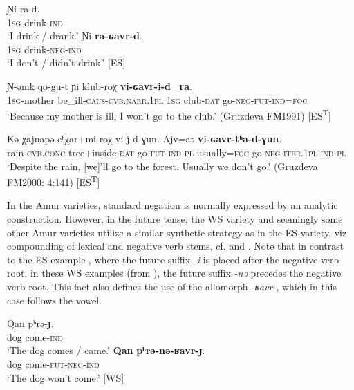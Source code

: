\documentclass[output=paper,colorlinks,citecolor=brown]{langscibook}
\begin{document}
\ea\label{ex:niv:1}
    \ea\label{ex:niv:1a}
        \gll Ɲi ra-d.  \\ 
             1\textsc{sg} drink-\textsc{ind}  \\
        \glt ‘I drink / drank.’
    \ex\label{ex:niv:1b}
        \gll Ɲi \textbf{ra-ɢavr-d}. \\
             1\textsc{sg} drink-\textsc{neg-ind}\\
        \glt  ‘I don’t / didn’t drink.’ [ES]
    \z
\z 

\ea\label{ex:niv:2}
    \gll Ɲ{}-əmk qo-gu-t ɲi klub-roχ \textbf{vi-ɢavr-i-d=ra}. \\ 
         \textsc{1sg}{}-mother be\_ill-\textsc{caus-cvb.narr.1pl} 1\textsc{sg} club-\textsc{dat} go-\textsc{neg-fut-ind=foc} \\
    \glt ‘Because my mother is ill, I won’t go to the club.’ (Gruzdeva FМ1991) [ES\textsuperscript{T}]
\z

\ea\label{ex:niv:3}
    \gll  Kə{}-χajnapə cʰχar+mi-roχ vi-j-d-ɣun. Ajv=at \textbf{vi-ɢavr-tʰa-d-ɣun}. \\ 
         rain-\textsc{cvb.conc} tree+inside-\textsc{dat} go-\textsc{fut-ind{}-pl} usually=\textsc{foc} go-\textsc{neg-iter.1pl-ind{}-pl}\\
    \glt ‘Despite the rain, [we]’ll go to the forest. Usually we don’t go.’ (Gruzdeva FM2000: 4:141) [ES\textsuperscript{T}]
\z 

In the Amur varieties, standard negation is normally expressed by an analytic construction. However, in the future tense, the WS variety and seemingly some other Amur varieties utilize a similar synthetic strategy as in the ES variety, viz. compounding of lexical and negative verb stems, cf.  and . Note that in contrast to the ES example , where the future suffix \textit{-i} is placed after the negative verb root, in these WS examples (from \citealt{Panfilov1965}), the future suffix \textit{-nə} precedes the negative verb root. This fact also defines the use of the allomorph \textit{-ʁavr-}, which in this case follows the vowel.

\ea\label{ex:niv:4}
    \ea\label{ex:niv:4a}
        \gll Qan pʰrə{}-ɟ. \\ 
             dog come-\textsc{ind} \\
        \glt ‘The dog comes / came.’
    \ex\label{ex:niv:4b}
        \gll \textbf{Qan} \textbf{pʰrə{}-nə{}-ʁavr-ɟ}. \\
             dog come-\textsc{fut-neg-ind}\\
        \glt  ‘The dog won’t come.’ [WS]
    \z
\z 
\end{document}
